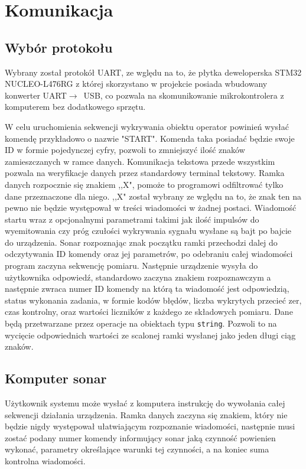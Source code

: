 \section{Komunikacja}

\subsection{Wybór protokołu}
Wybrany został protokół UART, ze wględu na to, że płytka deweloperska STM32 NUCLEO-L476RG 
z której skorzystano w projekcie posiada wbudowany konwerter UART$\rightarrow$~USB, 
co pozwala na skomunikowanie mikrokontrolera z komputerem bez dodatkowego sprzętu.

W celu uruchomienia sekwencji wykrywania obiektu operator powinień wysłać komendę przykładowo o nazwie "START". 
Komenda taka posiadać będzie swoje ID w formie pojedynczej cyfry, pozwoli to zmniejszyć ilość znaków zamieszczanych w ramce danych. 
Komunikacja tekstowa przede wszystkim pozwala na weryfikacje danych przez standardowy terminal tekstowy. 
Ramka danych rozpocznie się znakiem ,,X", pomoże to programowi odfiltrować tylko dane przeznaczone dla niego. ,,X" został wybrany ze wględu na to, 
że znak ten na pewno nie będzie występował w treści wiadomości w żadnej postaci.
Wiadomość startu wraz z opcjonalnymi parametrami takimi jak ilość impulsów do wyemitowania czy próg czułości wykrywania sygnału wysłane są bajt po bajcie do urządzenia. 
Sonar rozpoznając znak początku ramki przechodzi dalej do odczytywania ID komendy oraz jej parametrów, po odebraniu całej wiadomości program zaczyna sekwencję pomiaru.
Następnie urządzenie wysyła do użytkownika odpowiedź, standardowo zaczyna znakiem rozpoznawczym a następnie zwraca numer ID komendy na którą ta wiadomość jest odpowiedzią,
status wykonania zadania, w formie kodów błędów, liczba wykrytych przecieć zer, czas kontrolny, oraz wartości liczników z każdego ze składowych pomiaru.
Dane będą przetwarzane przez operacje na obiektach typu {\tt string}. Pozwoli to na wycięcie odpowiednich wartości ze scalonej ramki wysłanej jako jeden długi ciąg znaków.

\subsection{Komputer \textrightarrow{} sonar}
Użytkownik systemu może wysłać z komputera instrukcję do wywołania całej sekwencji działania urządzenia. 
Ramka danych zaczyna się znakiem, który nie będzie nigdy występował  ułatwiającym rozpoznanie wiadomości, 
następnie musi zostać podany numer komendy informujący sonar jaką czynność powienien wykonać, 
parametry określające warunki tej czynności, a na koniec suma kontrolna wiadomości.

